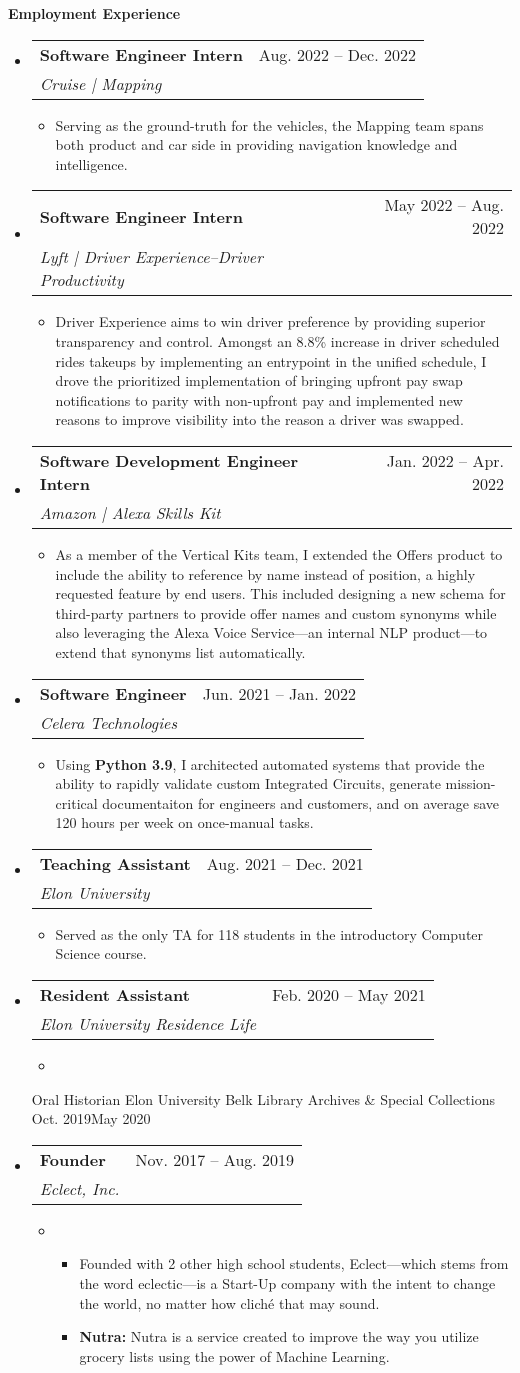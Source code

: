 \documentclass[letterpaper,10pt,draft]{article}
\makeatletter
\newlength{\outerbordwidth}
\newcommand{\openitem}[2]{\item[] \textbf{#1} #2\vspace{2pt}}
\newcommand{\secheading}[1]{\vspace{2pt}
	{
		\setlength{\FrameSep}{\outerbordwidth}
		\textbf{\large #1}
	}
}
\newcommand{\secsubheading}[4]{
\vspace{2pt}
\begin{tabular*}{6.86in}{l@{\cftdotfill{\cftsecdotsep}\extracolsep{\fill}}r}
		\textbf{#1} & #3 -- #4\\
		\textit{#2} \\
\end{tabular*}
}
\newcommand{\secitem}[5]{
	\item[]
		\secsubheading{#1}{#2}{#3}{#4}
		\vspace{-10pt}
		\begin{itemize}
			\item[]{#5}
		\end{itemize}
}
\makeatother
\begin{document}
	\secheading{Employment Experience}
	\begin{itemize}
		\secitem{Software Engineer Intern}
			{Cruise | Mapping}
			{Aug. 2022}{Dec. 2022}
			{Serving as the ground-truth for the vehicles, the Mapping team spans both product and car side in providing navigation knowledge and intelligence.}

		\secitem{Software Engineer Intern}
			{Lyft | Driver Experience--Driver Productivity}
			{May 2022}{Aug. 2022}
			{Driver Experience aims to win driver preference by providing superior transparency and control. Amongst an 8.8\% increase in driver scheduled rides takeups by implementing an entrypoint in the unified schedule, I drove the prioritized implementation of bringing upfront pay swap notifications to parity with non-upfront pay and implemented new reasons to improve visibility into the reason a driver was swapped.}

		\secitem{Software Development Engineer Intern}
			{Amazon | Alexa Skills Kit}
			{Jan. 2022}{Apr. 2022}
			{As a member of the Vertical Kits team, I extended the Offers product to include the ability to reference by name instead of position, a highly requested feature by end users. This included designing a new schema for third-party partners to provide offer names and custom synonyms while also leveraging the Alexa Voice Service—an internal NLP product—to extend that synonyms list automatically.}

		\secitem{Software Engineer}
			{Celera Technologies}
			{Jun. 2021}{Jan. 2022}
			{Using \textbf{Python 3.9}, I architected automated systems that provide the ability to rapidly validate custom Integrated Circuits, generate mission-critical documentaiton for engineers and customers, and on average save 120 hours per week on once-manual tasks.}

		\secitem{Teaching Assistant}
			{Elon University}
			{Aug. 2021}{Dec. 2021}
			{Served as the only TA for 118 students in the introductory Computer Science course.}

		\secitem{Resident Assistant}
			{Elon University Residence Life}
			{Feb. 2020}{May 2021}

		\secitem{Oral Historian}
			{Elon University Belk Library Archives \& Special Collections}
			{Oct. 2019}{May 2020}

		\secitem{Founder}
			{Eclect, Inc.}
			{Nov. 2017}{Aug. 2019}
			{
				\begin{itemize}
					\openitem{}{Founded with 2 other high school students, Eclect---which stems from the word eclectic---is a Start-Up company with the intent to change the world, no matter how clich\'e that may sound.}
					\openitem{\bf Nutra:}{Nutra is a service created to improve the way you utilize grocery lists using the power of Machine Learning.}
				\end{itemize}
			}


\end{itemize}
\end{document}
